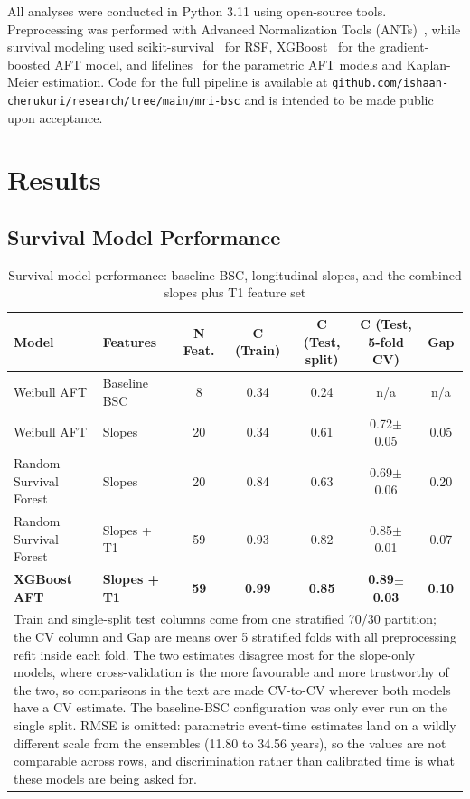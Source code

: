 \documentclass[blue]{ludusofficial}  %
\begin{document}
All analyses were conducted in Python 3.11 using open-source tools. Preprocessing was performed with Advanced Normalization Tools (ANTs)~\cite{avants2011ants}, while survival modeling used scikit-survival~\cite{polsterl2020sksurv} for RSF, XGBoost~\cite{chen2016xgboost} for the gradient-boosted AFT model, and lifelines~\cite{davidson-pilon2019lifelines} for the parametric AFT models and Kaplan-Meier estimation. Code for the full pipeline is available at \texttt{github.com/ishaan-cherukuri/research/tree/main/mri-bsc} and is intended to be made public upon acceptance.

\section{Results}

\subsection{Survival Model Performance}

\begin{table}[!htbp]
\centering
\caption{Survival model performance: baseline BSC, longitudinal slopes, and the combined slopes plus T1 feature set}
\label{tab:model-performance}
\begin{tabular}{llccccc}
\hline
\textbf{Model} & \textbf{Features} & \textbf{N Feat.} & \textbf{C (Train)} & \textbf{C (Test, split)} & \textbf{C (Test, 5-fold CV)} & \textbf{Gap} \\
\hline
Weibull AFT & Baseline BSC & 8 & 0.34 & 0.24 & n/a & n/a \\
Weibull AFT & Slopes & 20 & 0.34 & 0.61 & 0.72$\pm$0.05 & 0.05 \\
Random Survival Forest & Slopes & 20 & 0.84 & 0.63 & 0.69$\pm$0.06 & 0.20 \\
Random Survival Forest & Slopes + T1 & 59 & 0.93 & 0.82 & 0.85$\pm$0.01 & 0.07 \\
\hline
\textbf{XGBoost AFT} & \textbf{Slopes + T1} & \textbf{59} & \textbf{0.99} & \textbf{0.85} & \textbf{0.89$\pm$0.03} & \textbf{0.10} \\
\hline
\multicolumn{7}{p{0.95\textwidth}}{\footnotesize Train and single-split test columns come from one stratified 70/30 partition; the CV column and Gap are means over 5 stratified folds with all preprocessing refit inside each fold. The two estimates disagree most for the slope-only models, where cross-validation is the more favourable and more trustworthy of the two, so comparisons in the text are made CV-to-CV wherever both models have a CV estimate. The baseline-BSC configuration was only ever run on the single split. RMSE is omitted: parametric event-time estimates land on a wildly different scale from the ensembles (11.80 to 34.56 years), so the values are not comparable across rows, and discrimination rather than calibrated time is what these models are being asked for.} \\
\end{tabular}
\end{table}
\end{document}
